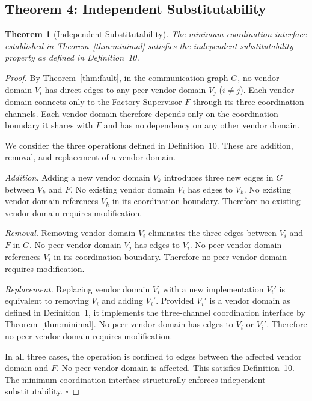 \documentclass[a4paper,fleqn]{cas-dc}
\newtheorem{theorem}{Theorem}
\begin{document}
\subsection{Theorem 4: Independent Substitutability}

\begin{theorem}[Independent Substitutability]
\label{thm:substitutability}
The minimum coordination interface established in Theorem~\ref{thm:minimal} satisfies the independent substitutability property as defined in Definition~10.
\end{theorem}

\begin{proof}
By Theorem~\ref{thm:fault}, in the communication graph $G$, no vendor domain $V_i$ has direct edges to any peer vendor domain $V_j$ ($i \neq j$). Each vendor domain connects only to the Factory Supervisor $F$ through its three coordination channels. Each vendor domain therefore depends only on the coordination boundary it shares with $F$ and has no dependency on any other vendor domain.

We consider the three operations defined in Definition~10. These are addition, removal, and replacement of a vendor domain.

\textit{Addition.} Adding a new vendor domain $V_k$ introduces three new edges in $G$ between $V_k$ and $F$. No existing vendor domain $V_i$ has edges to $V_k$. No existing vendor domain references $V_k$ in its coordination boundary. Therefore no existing vendor domain requires modification.

\textit{Removal.} Removing vendor domain $V_i$ eliminates the three edges between $V_i$ and $F$ in $G$. No peer vendor domain $V_j$ has edges to $V_i$. No peer vendor domain references $V_i$ in its coordination boundary. Therefore no peer vendor domain requires modification.

\textit{Replacement.} Replacing vendor domain $V_i$ with a new implementation $V_i'$ is equivalent to removing $V_i$ and adding $V_i'$. Provided $V_i'$ is a vendor domain as defined in Definition~1, it implements the three-channel coordination interface by Theorem~\ref{thm:minimal}. No peer vendor domain has edges to $V_i$ or $V_i'$. Therefore no peer vendor domain requires modification.

In all three cases, the operation is confined to edges between the affected vendor domain and $F$. No peer vendor domain is affected. This satisfies Definition~10. The minimum coordination interface structurally enforces independent substitutability. \hfill$\square$
\end{proof}
\end{document}
